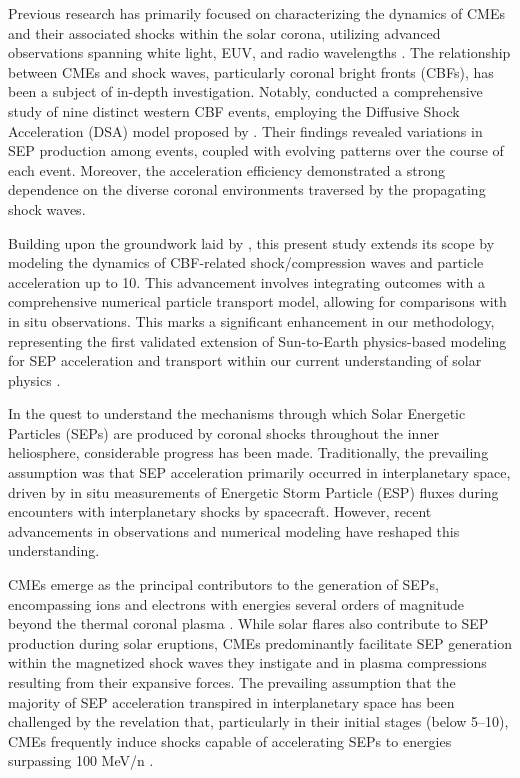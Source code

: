 Previous research has primarily focused on characterizing the dynamics of CMEs and their associated shocks within the solar corona, utilizing advanced observations spanning white light, EUV, and radio wavelengths \citep{vourlidas_2003, zhang_2006, bein_2011}. The relationship between CMEs and shock waves, particularly coronal bright fronts (CBFs), has been a subject of in-depth investigation. Notably, \citet{kozarev_2019} conducted a comprehensive study of nine distinct western CBF events, employing the Diffusive Shock Acceleration (DSA) model proposed by \citet{kozarev_2016}. Their findings revealed variations in SEP production among events, coupled with evolving patterns over the course of each event. Moreover, the acceleration efficiency demonstrated a strong dependence on the diverse coronal environments traversed by the propagating shock waves.

Building upon the groundwork laid by \citet{kozarev_2019}, this present study extends its scope by modeling the dynamics of CBF-related shock/compression waves and particle acceleration up to 10\rsun. This advancement involves integrating outcomes with a comprehensive numerical particle transport model, allowing for comparisons with in situ observations. This marks a significant enhancement in our methodology, representing the first validated extension of Sun-to-Earth physics-based modeling for SEP acceleration and transport within our current understanding of solar physics \citep{kozarev_2022}.

In the quest to understand the mechanisms through which Solar Energetic Particles (SEPs) are produced by coronal shocks throughout the inner heliosphere, considerable progress has been made. Traditionally, the prevailing assumption was that SEP acceleration primarily occurred in interplanetary space, driven by in situ measurements of Energetic Storm Particle (ESP) fluxes during encounters with interplanetary shocks by spacecraft. However, recent advancements in observations and numerical modeling have reshaped this understanding.

CMEs emerge as the principal contributors to the generation of SEPs, encompassing ions and electrons with energies several orders of magnitude beyond the thermal coronal plasma \citep{reames_1999}. While solar flares also contribute to SEP production during solar eruptions, CMEs predominantly facilitate SEP generation within the magnetized shock waves they instigate and in plasma compressions resulting from their expansive forces. The prevailing assumption that the majority of SEP acceleration transpired in interplanetary space has been challenged by the revelation that, particularly in their initial stages (below 5–10\rsun), CMEs frequently induce shocks capable of accelerating SEPs to energies surpassing 100 MeV/n \citep{ontiveross_2009, gopalswamy_2011, battarbee_2013, kozarev_2013, schwadron_2014, kong_2017}.

